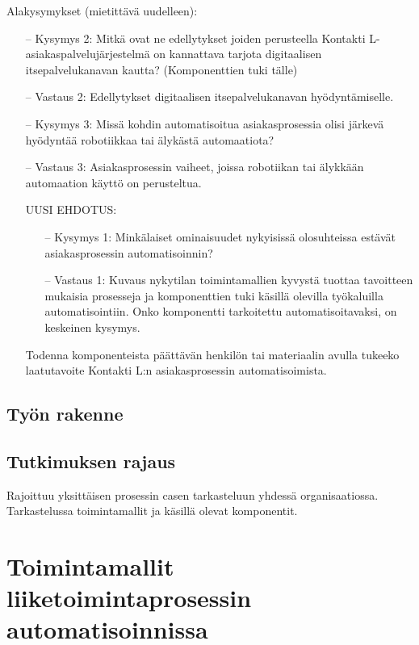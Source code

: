 \documentclass[finnish,12pt,a4paper,pdftex]{article}
\begin{document}
Alakysymykset (mietittävä uudelleen):
\begin{itemize}
\item[--]Kysymys 2: Mitkä ovat ne edellytykset joiden perusteella Kontakti L- asiakaspalvelujärjestelmä on kannattava tarjota digitaalisen itsepalvelukanavan kautta? (Komponenttien tuki tälle)
\item[--]Vastaus 2: Edellytykset digitaalisen itsepalvelukanavan hyödyntämiselle.
\item[--]Kysymys 3: Missä kohdin automatisoitua asiakasprosessia olisi järkevä hyödyntää robotiikkaa tai älykästä automaatiota?
\item[--]Vastaus 3: Asiakasprosessin vaiheet, joissa robotiikan tai älykkään automaation käyttö on perusteltua.

UUSI EHDOTUS:
\begin{itemize}
\item[--]Kysymys 1: Minkälaiset ominaisuudet nykyisissä olosuhteissa estävät asiakasprosessin automatisoinnin?
\item[--]Vastaus 1: Kuvaus nykytilan toimintamallien kyvystä tuottaa tavoitteen mukaisia prosesseja ja komponenttien tuki käsillä olevilla työkaluilla automatisointiin. Onko komponentti tarkoitettu automatisoitavaksi, on keskeinen kysymys.
\end{itemize}



Todenna komponenteista päättävän henkilön tai materiaalin avulla tukeeko laatutavoite Kontakti L:n asiakasprosessin automatisoimista. 




\end{itemize}
\subsection{Työn rakenne}


\subsection{Tutkimuksen rajaus}

Rajoittuu yksittäisen prosessin casen tarkasteluun yhdessä organisaatiossa. Tarkastelussa toimintamallit ja käsillä olevat komponentit.

\clearpage

\section{Toimintamallit liiketoimintaprosessin automatisoinnissa}
\end{document}
